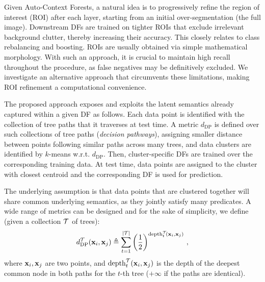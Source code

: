 Given Auto-Context Forests, a natural idea is to progressively refine the region of interest (ROI) after each layer, starting from an initial over-segmentation (\eg the full image). Downstream DFs are trained on tighter ROIs that exclude irrelevant background clutter, thereby increasing their accuracy. This closely relates to class rebalancing and boosting. ROIs are usually obtained via simple mathematical morphology. With such an approach, it is crucial to maintain high recall throughout the procedure, as false negatives may be definitively excluded. We investigate an alternative approach that circumvents these limitations, making ROI refinement a computational convenience.

The proposed approach exposes and exploits the latent semantics already captured within a given DF as follows. Each data point is identified with the collection of tree paths that it traverses at test time. A metric $d_{\text{DP}}$ is defined over such collections of tree paths (\textit{decision pathways}), assigning smaller distance between points following similar paths across many trees, and data clusters are identified by $k$-means w.r.t. $d_{\text{DP}}$. %
Then, cluster-specific DFs are trained over the corresponding training data. At test time, data points are assigned to the cluster with closest centroid and the corresponding DF is used for prediction.

The underlying assumption is that data points that are clustered together will share common underlying semantics, as they jointly satisfy many predicates. A wide range of metrics can be designed and for the sake of simplicity, we define (given a collection $\mathcal{T}$ of trees):
\begin{equation}
d_{\text{DP}}^{\mathcal{T}}(\boldsymbol{\mathrm{x}}_i, \boldsymbol{\mathrm{x}}_j)\triangleq \sum_{t=1}^{\vert\mathcal{T}\vert} \left(\frac{1}{2}\right)^{\text{depth}_t^{\mathcal{T}}\!(\boldsymbol{\mathrm{x}}_i,\boldsymbol{\mathrm{x}}_j)}\, ,
\end{equation}
where $\boldsymbol{\mathrm{x}}_i, \boldsymbol{\mathrm{x}}_j$ are two points, and $\text{depth}_t^{\mathcal{T}}(\boldsymbol{\mathrm{x}}_i,\boldsymbol{\mathrm{x}}_j)$ is the depth of the deepest common node in both paths for the $t$-th tree ($+\infty$ if the paths are identical).

